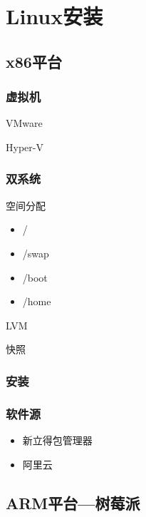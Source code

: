 \chapter{Linux安装}
	\section{x86平台}
		\subsection{虚拟机}
			\par VMware
			\par Hyper-V
		\subsection{双系统}
			\par 空间分配
				\begin{itemize}
					\item /
					\item /swap
					\item /boot
					\item /home
				\end{itemize}
			\par LVM
			\par 快照
		\subsection{安装}
		\subsection{软件源}
			\begin{itemize}
				\item 新立得包管理器
				\item 阿里云
			\end{itemize}
	\section{ARM平台---树莓派}
